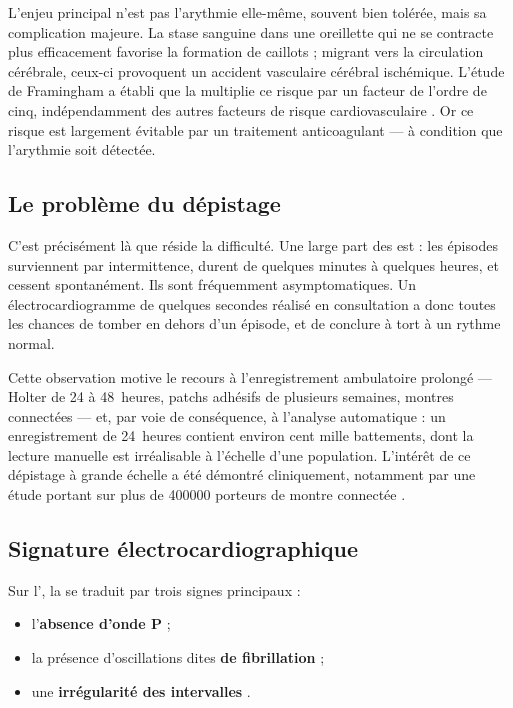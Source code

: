 L'enjeu principal n'est pas l'arythmie elle-même, souvent bien tolérée, mais sa complication majeure. La stase sanguine dans une oreillette qui ne se contracte plus efficacement favorise la formation de caillots ; migrant vers la circulation cérébrale, ceux-ci provoquent un accident vasculaire cérébral ischémique. L'étude de Framingham a établi que la \FA{} multiplie ce risque par un facteur de l'ordre de cinq, indépendamment des autres facteurs de risque cardiovasculaire \cite{wolf1991atrial}. Or ce risque est largement évitable par un traitement anticoagulant — à condition que l'arythmie soit détectée.

\subsection{Le problème du dépistage}
C'est précisément là que réside la difficulté. Une large part des \FA{} est  : les épisodes surviennent par intermittence, durent de quelques minutes à quelques heures, et cessent spontanément. Ils sont fréquemment asymptomatiques. Un électrocardiogramme de quelques secondes réalisé en consultation a donc toutes les chances de tomber en dehors d'un épisode, et de conclure à tort à un rythme normal.

Cette observation motive le recours à l'enregistrement ambulatoire prolongé — Holter de 24 à 48~heures, patchs adhésifs de plusieurs semaines, montres connectées — et, par voie de conséquence, à l'analyse automatique : un enregistrement de 24~heures contient environ cent mille battements, dont la lecture manuelle est irréalisable à l'échelle d'une population. L'intérêt de ce dépistage à grande échelle a été démontré cliniquement, notamment par une étude portant sur plus de \num{400000} porteurs de montre connectée \cite{perez2019large}.

\subsection{Signature électrocardiographique}
Sur l'\ECG{}, la \FA{} se traduit par trois signes principaux :
\begin{itemize}
  \item l'\textbf{absence d'onde P} ;
  \item la présence d'oscillations dites \textbf{de fibrillation} ;
  \item une \textbf{irrégularité des intervalles \RR{}}.
\end{itemize}

